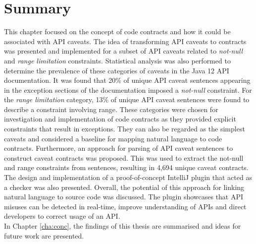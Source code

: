 \section{Summary}
\label{sec:contract-summary}
This chapter focused on the concept of code contracts and how it could be associated with API caveats. The idea of transforming API caveats to contracts was presented and implemented for a subset of API caveats related to \textit{not-null} and \textit{range limitation} constraints. Statistical analysis was also performed to determine the prevalence of these categories of caveats in the Java 12 API documentation. It was found that 20\% of unique API caveat sentences appearing in the exception sections of the documentation imposed a \textit{not-null} constraint. For the \textit{range limitation} category, 13\% of unique API caveat sentences were found to describe a constraint involving range. These categories were chosen for investigation and implementation of code contracts as they provided explicit constraints that result in exceptions. They can also be regarded as the simplest caveats and considered a baseline for mapping natural language to code contracts. Furthermore, an approach for parsing of API caveat sentences to construct caveat contracts was proposed. This was used to extract the not-null and range constraints from sentences, resulting in 4,694 unique caveat contracts. The design and implementation of a proof-of-concept IntelliJ plugin that acted as a checker was also presented. Overall, the potential of this approach for linking natural language to source code was discussed. The plugin showcases that API misuses can be detected in real-time, improve understanding of APIs and direct developers to correct usage of an API.\\
In Chapter \ref{cha:conc}, the findings of this thesis are summarised and ideas for future work are presented.

